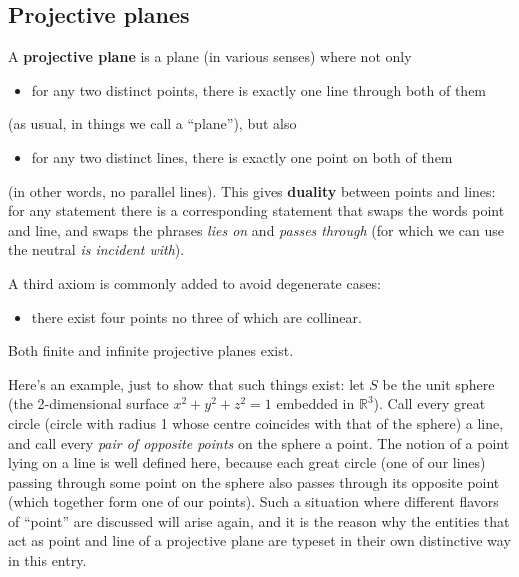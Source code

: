 \documentclass[12pt]{article}
\def\Rset{\mathbb{R}}
\begin{document}

\subsection*{Projective planes}

A {\bf projective plane} is a plane (in various senses) where not only
%
\begin{itemize}

\item for any two distinct {\sc point}s,
      there is exactly one {\sc line} through both of them

\end{itemize}
%
(as usual, in things we call a ``plane''), but also
%
\begin{itemize}

\item for any two distinct {\sc line}s,
      there is exactly one {\sc point} on both of them

\end{itemize}
%
(in other words, no parallel {\sc line}s). This gives {\bf duality} between
{\sc point}s and {\sc line}s: for any statement there is a corresponding statement
that swaps the words {\sc point} and {\sc line}, and swaps the phrases {\em lies on\/}
and {\em passes through\/} (for which we can use the neutral
{\em is incident with\/}).

A third axiom is commonly added to avoid degenerate cases:
%
\begin{itemize}

\item there exist four points no three of which are collinear.

\end{itemize}
%

Both finite and infinite projective planes exist.

Here's an example, just to show that such things exist: let $S$ be the unit
sphere (the 2-dimensional surface $x^2+y^2+z^2=1$ embedded in $\Rset^3$). Call
every great circle (circle with radius 1 whose centre coincides with that of
the sphere) a {\sc line}, and call every {\em pair of opposite points\/} on
the sphere a {\sc point}. The notion of a {\sc point} lying on a {\sc line} is
well defined here, because each great circle (one of our {\sc line}s) passing
through some point on the sphere also passes through its opposite point
(which together form one of our {\sc point}s). Such a situation where different
flavors of ``point'' are discussed will arise again, and it is the reason
why the entities that act as {\sc point} and {\sc line} of a projective plane are typeset in their
own distinctive way in this entry.
\end{document}
